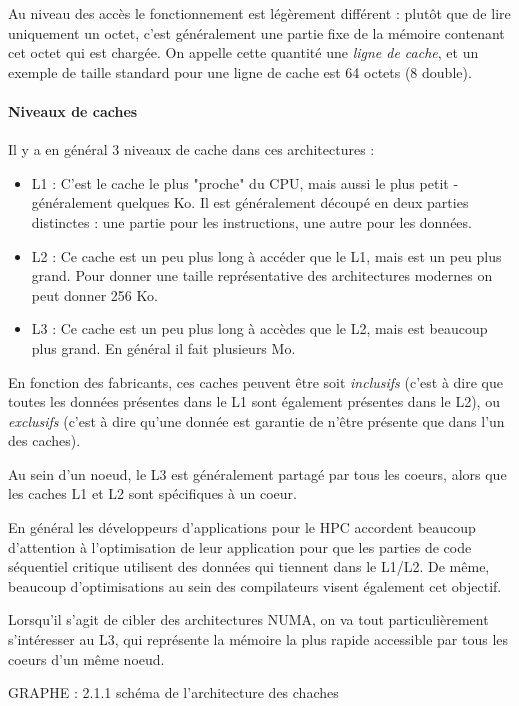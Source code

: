 Au niveau des accès le fonctionnement est légèrement différent : plutôt que de lire uniquement un octet, c'est généralement une partie fixe de la mémoire contenant cet octet qui est chargée.
On appelle cette quantité une \emph{ligne de cache}, et un exemple de taille standard pour une ligne de cache est 64 octets (8 double).

\paragraph{Niveaux de caches}

Il y a en général 3 niveaux de cache dans ces architectures :
\begin{itemize}
  \item L1 : C'est le cache le plus "proche" du CPU, mais aussi le plus petit - généralement quelques Ko. Il est généralement découpé en deux parties distinctes : une partie pour les instructions, une autre pour les données.
  \item L2 : Ce cache est un peu plus long à accéder que le L1, mais est un peu plus grand. Pour donner une taille représentative des architectures modernes on peut donner 256 Ko.
  \item L3 : Ce cache est un peu plus long à accèdes que le L2, mais est beaucoup plus grand. En général il fait plusieurs Mo.
\end{itemize}

En fonction des fabricants, ces caches peuvent être soit \emph{inclusifs} (c'est à dire que toutes les données présentes dans le L1 sont également présentes dans le L2), ou \emph{exclusifs} (c'est à dire qu'une donnée est garantie de n'être présente que dans l'un des caches).

Au sein d'un noeud, le L3 est généralement partagé par tous les coeurs, alors que les caches L1 et L2 sont spécifiques à un coeur.

En général les développeurs d'applications pour le HPC accordent beaucoup d'attention à l'optimisation de leur application pour que les parties de code séquentiel critique utilisent des données qui tiennent dans le L1/L2.
De même, beaucoup d'optimisations au sein des compilateurs visent également cet objectif.

Lorsqu'il s'agit de cibler des architectures NUMA, on va tout particulièrement s'intéresser au L3, qui représente la mémoire la plus rapide accessible par tous les coeurs d'un même noeud.

GRAPHE : 2.1.1 schéma de l'architecture des chaches

